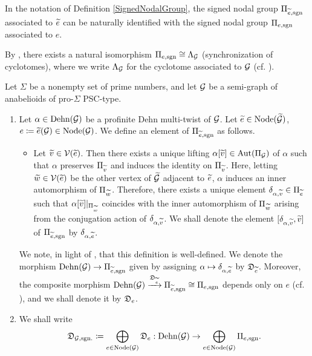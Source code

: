\begin{rem}
  In the notation of Definition \ref{SignedNodalGroup}, the signed nodal group $\Pi_{\widetilde{e}, \mathrm{sgn}}$ associated to $\widetilde{e}$ can be naturally identified with the signed nodal group $\Pi_{e, \mathrm{sgn}}$ associated to $e$.
\end{rem}

\begin{rem}\label{CyclotomesAndSignedNodalGroup}
  By \cite[Corollary 3.9, (vi)]{CbTpI}, there exists a natural isomorphism $\Pi_{e, \mathrm{sgn}} \cong \Lambda_{\mathcal{G}}$ (synchronization of cyclotomes), where we write $\Lambda_{\mathcal{G}}$ for the cyclotome associated to $\mathcal{G}$ (cf. \cite[Definition 3.8, (i)]{CbTpI}).
\end{rem}

\begin{defn}
  Let $\Sigma$ be a nonempty set of prime numbers, and let $\mathcal{G}$ be a semi-graph of anabelioids of pro-$\Sigma$ PSC-type.
  \begin{enumerate}
    \item Let $\alpha \in \mathrm{Dehn}(\mathcal{G})$ be a profinite Dehn multi-twist of $\mathcal{G}$. Let $\widetilde{e} \in \mathrm{Node}(\widetilde{\mathcal{G}})$, $e \coloneqq \widetilde{e}(\mathcal{G}) \in \mathrm{Node}(\mathcal{G})$. We define an element of $\Pi_{\widetilde{e}, \mathrm{sgn}}$ as follows.
  \begin{itemize}
    \item Let $\widetilde{v} \in \mathcal{V}(\widetilde{e})$. Then there exists a unique lifting $\alpha[\widetilde{v}] \in \mathrm{Aut}(\Pi_{\mathcal{G}})$ of $\alpha$ such that $\alpha$ preserves $\Pi_{\widetilde{v}}$ and induces the identity on $\Pi_{\widetilde{v}}$. Here, letting $\widetilde{w} \in \mathcal{V}(\widetilde{e})$ be the other vertex of $\widetilde{\mathcal{G}}$ adjacent to $\widetilde{e}$, $\alpha$ induces an inner automorphism of $\Pi_{\widetilde{w}}$. Therefore, there exists a unique element $\delta_{\alpha, \widetilde{v}} \in \Pi_{\widetilde{e}}$ such that $\alpha[\widetilde{v}]|_{\Pi_{\widetilde{w}}}$ coincides with the inner automorphism of $\Pi_{\widetilde{w}}$ arising from the conjugation action of $\delta_{\alpha, \widetilde{v}}$. We shall denote the element $[\delta_{\alpha, \widetilde{v}}, \widetilde{v}]$ of $\Pi_{\widetilde{e}, \mathrm{sgn}}$ by $\delta_{\alpha, \widetilde{e}}$.
  \end{itemize}
  We note, in light of \cite[Lemma 4.6]{CbTpI}, that this definition is well-defined. We denote the morphism $\mathrm{Dehn}(\mathcal{G}) \to \Pi_{\widetilde{e}, \mathrm{sgn}}$ given by assigning $\alpha \mapsto \delta_{\alpha, \widetilde{e}}$ by $\mathfrak{D}_{\widetilde{e}}$. Moreover, the composite morphism $\mathrm{Dehn}(\mathcal{G}) \xrightarrow{\mathfrak{D}_{\widetilde{e}}} \Pi_{\widetilde{e}, \mathrm{sgn}} \cong \Pi_{e, \mathrm{sgn}}$ depends only on $e$ (cf. \cite[Lemma 4.6]{CbTpI}), and we shall denote it by $\mathfrak{D}_{e}$.
  \item We shall write \[\mathfrak{D}_{\mathcal{G}, \mathrm{sgn.}} \coloneqq \bigoplus_{e \in \mathrm{Node}(\mathcal{G})} \mathfrak{D}_{e} : \mathrm{Dehn}(\mathcal{G}) \to \bigoplus_{e \in \mathrm{Node}(\mathcal{G})} \Pi_{e, \mathrm{sgn}}.\]
  \end{enumerate}
\end{defn}

